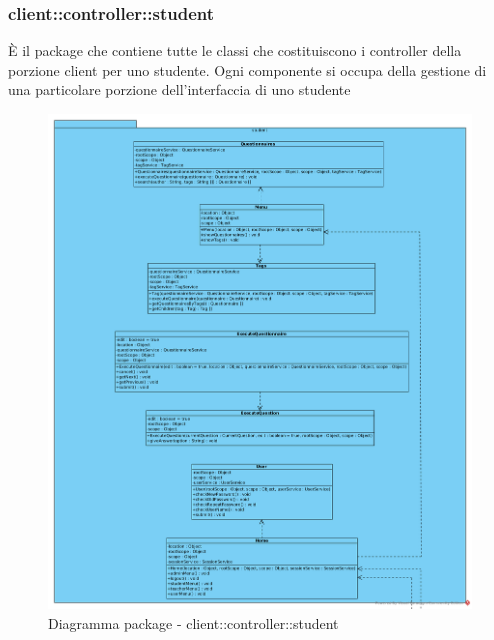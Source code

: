 \subsubsection{client::controller::student}
È il package che contiene tutte le classi che costituiscono i controller della porzione client per uno studente. Ogni componente si occupa della gestione di una particolare porzione dell'interfaccia di uno studente\begin{center}
		\begin{figure}[H]
			\centering \includegraphics[scale=4, max width=\textwidth, max height=\myheight]{../img/diagrammiClassi/client/controller/student.png}
			\caption{Diagramma package - client::controller::student}
		\end{figure}
	\end{center}\hypertarget{client::controller::student::Home}{}
